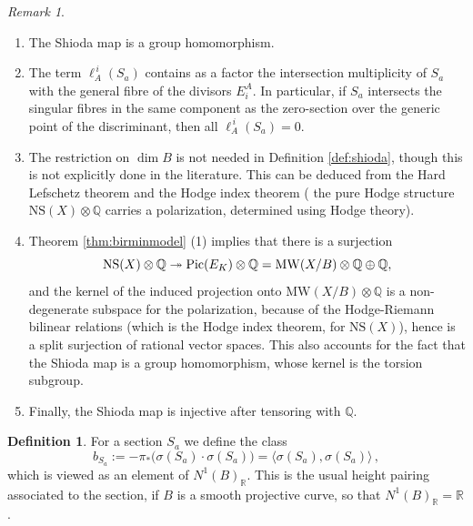 \documentclass[11pt]{amsart}
\theoremstyle{definition}
\newtheorem{definition}[theorem]{Definition}
\theoremstyle{definition}
\theoremstyle{remark}
\newtheorem{remark}[theorem]{Remark}
\theoremstyle{remark}
\theoremstyle{definition}
\theoremstyle{conjecture}
\newcommand{\NS}{\mathrm{NS}}
\newcommand{\MW}{\mathrm{MW}}
\begin{document}
\begin{remark}\label{remark:ell-vanishing}
\begin{enumerate}[(\alph*)]
\item  The Shioda map is  a group homomorphism. 
\item The term $\ell^{\,i}_A(S_a)$ contains as a factor the intersection multiplicity of $S_a$ with the general fibre of the 
 divisors $E^A_i$.
  In particular, if $S_a$ intersects the singular fibres in the same component as the zero-section over the generic point of the discriminant, then all $\ell^{\,i}_A(S_a)=0$.

 \item The restriction on
$\dim B$ is not needed in Definition \ref{def:shioda}, though this is not
explicitly done in the literature. This can be deduced from the
Hard Lefschetz theorem and the Hodge index theorem (%
the
pure Hodge structure $\NS(X)\otimes{\mathbb Q}$ carries a polarization,
determined using Hodge theory). 


\item  Theorem \ref{thm:birminmodel} (1) implies that there is a surjection
\[{\rm NS}(X)\otimes{\mathbb Q} \twoheadrightarrow {\rm Pic}(E_K)\otimes{\mathbb
Q}=\MW(X/B)\otimes{\mathbb Q}\oplus {\mathbb Q},\]
and the kernel of the induced projection onto $\MW(X/B)\otimes{\mathbb
Q}$ is a non-degenerate subspace for the polarization, because of the
Hodge-Riemann bilinear relations (which is the Hodge index theorem,
for $\NS(X)$), hence is a split surjection of rational vector spaces.
This also accounts for the fact that the Shioda map is a group
homomorphism, whose kernel is the torsion subgroup.

 \item 
 Finally, the Shioda map is injective after tensoring with ${\mathbb Q}$.

\end{enumerate}


\end{remark}





\begin{definition}\label{def:heightpairing}
  For a section $S_a$ we define the class
  \[
    b_{S_a}
    := -\pi_*   \bigl( \sigma(S_a) \cdot  \sigma(S_a)  \bigr) = \langle  \sigma(S_a),  \sigma(S_a) \rangle  \,,
  \]
   which is viewed as an element of
$N^1(B)_{\mathbb R}$. This is the usual height pairing associated to
the section, if $B$ is a smooth projective curve, so that
$N^1(B)_{\mathbb R}={\mathbb R}$. 
\end{definition}
\end{document}

